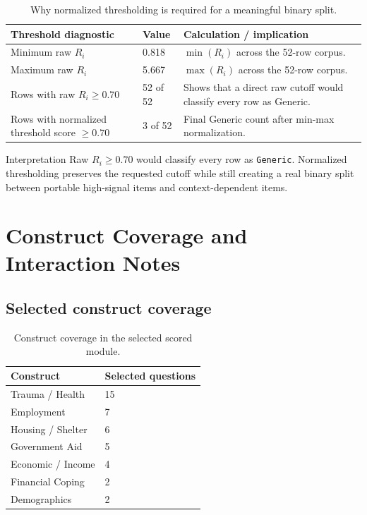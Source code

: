 \documentclass[12pt]{article}
\begin{document}
\begin{table}[H]
\centering
\begin{tabularx}{\textwidth}{L{0.36\textwidth} R{0.12\textwidth} Y}
\toprule
Threshold diagnostic & Value & Calculation / implication \\
\midrule
Minimum raw $R_i$ & 0.818 & $\min(R_i)$ across the 52-row corpus. \\
Maximum raw $R_i$ & 5.667 & $\max(R_i)$ across the 52-row corpus. \\
Rows with raw $R_i \geq 0.70$ & 52 of 52 & Shows that a direct raw cutoff would classify every row as Generic. \\
Rows with normalized threshold score $\geq 0.70$ & 3 of 52 & Final Generic count after min-max normalization. \\
\bottomrule
\end{tabularx}
\caption{Why normalized thresholding is required for a meaningful binary split.}
\end{table}

\begin{psidbox}{Interpretation}
Raw $R_i \geq 0.70$ would classify every row as \texttt{Generic}. Normalized thresholding preserves the requested cutoff while still creating a real binary split between portable high-signal items and context-dependent items.
\end{psidbox}

\section{Construct Coverage and Interaction Notes}

\subsection{Selected construct coverage}

\begin{table}[H]
\centering
\begin{tabularx}{0.58\textwidth}{L{0.38\textwidth} R{0.10\textwidth}}
\toprule
Construct & Selected questions \\
\midrule
Trauma / Health & 15 \\
Employment & 7 \\
Housing / Shelter & 6 \\
Government Aid & 5 \\
Economic / Income & 4 \\
Financial Coping & 2 \\
Demographics & 2 \\
\bottomrule
\end{tabularx}
\caption{Construct coverage in the selected scored module.}
\end{table}
\end{document}
